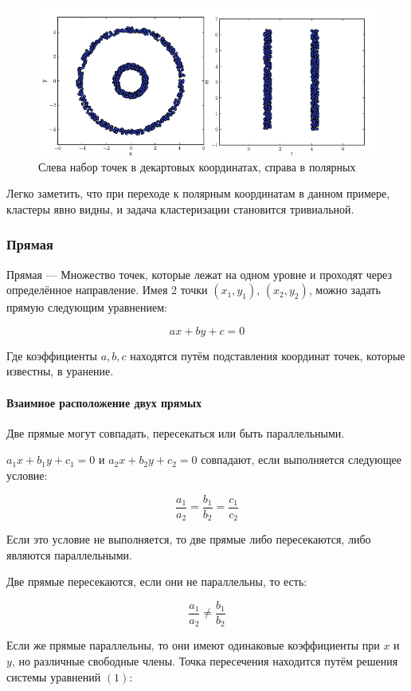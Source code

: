 \begin{figure}[H]
    \centering
    \includegraphics[width = 12cm]{Clusters.png}
    \caption{Слева набор точек в декартовых координатах, справа в полярных}
    \label{fig:float}
\end{figure}

Легко заметить, что при переходе к полярным координатам в данном примере, кластеры явно видны, и задача кластеризации становится тривиальной.

\subsubsection{Прямая}

Прямая — Множество точек, которые лежат на одном уровне и проходят через определённое направление. Имея 2 точки $(x_1, y_1)$, $(x_2, y_2)$, можно задать прямую следующим уравнением:

\[
    ax + by + c = 0
\]

Где коэффициенты $a,b,c$ находятся путём подставления координат точек, которые известны, в уранение.

\paragraph*{Взаимное расположение двух прямых}
Две прямые могут совпадать, пересекаться или быть параллельными.

\( a_1x + b_1y + c_1 = 0 \) и \( a_2x + b_2y + c_2 = 0 \) совпадают, если выполняется следующее условие:

\[
    \frac{a_1}{a_2} = \frac{b_1}{b_2} = \frac{c_1}{c_2}
\]

Если это условие не выполняется, то две прямые либо пересекаются, либо являются параллельными.

Две прямые пересекаются, если они не параллельны, то есть:

\[
    \frac{a_1}{a_2} \neq \frac{b_1}{b_2}
\]

Если же прямые параллельны, то они имеют одинаковые коэффициенты при \(x\) и \(y\), но различные свободные члены. Точка пересечения находится путём решения системы уравнений $(1)$:

